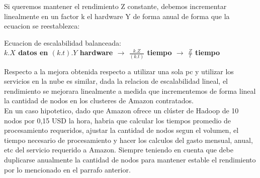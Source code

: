 \documentclass{article}
\begin{document}
Si queremos mantener el rendimiento Z constante, debemos incrementar linealmente en un factor k el hardware Y de forma anual de forma que la ecuacion se reestablezca:
\begin{center}
    Ecuacion de escalabilidad balanceada:\\
    \textbf{$k.X$ datos en $(k.t).Y$ hardware $\rightarrow$ $\frac{k.Z}{(k.t)}$ tiempo $\rightarrow$ $\frac{Z}{t}$ tiempo}
\end{center}

Respecto a la mejora obtenida respecto a utilizar una sola pc y utilizar los servicios en la nube es similar, dada la relacion de escalabilidad lineal, el rendimiento se mejorara linealmente a medida que incrementemos de forma lineal la cantidad de nodos en los clusteres de Amazon contratados.\\

En un caso hipotetico, dado que Amazon ofrece un clúster de Hadoop de 10 nodos por 0,15 USD la hora, habria que calcular los tiempos promedio de procesamiento requeridos, ajustar la cantidad de nodos segun el volumen, el tiempo necesario de procesamiento y hacer los calculos del gasto mensual, anual, etc del servicio requerido a Amazon. Siempre teniendo en cuenta que debe duplicarse anualmente la cantidad de nodos para mantener estable el rendimiento por lo mencionado en el parrafo anterior.
\end{document}
